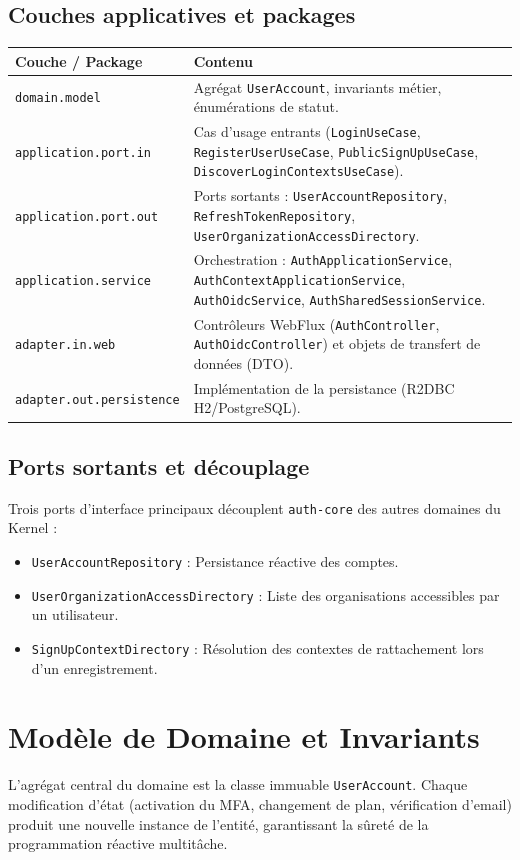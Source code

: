 \documentclass[
]{IPLeiriaThesis}
\newcommand{\code}[1]{\texttt{\small #1}}
\begin{document}
\subsection{Couches applicatives et packages}
\begin{center}
\small
\begin{longtable}{@{}p{4cm}p{10cm}@{}}
\toprule
\textbf{Couche / Package} & \textbf{Contenu} \\
\midrule
\code{domain.model} & Agrégat \code{UserAccount}, invariants métier, énumérations de statut. \\
\code{application.port.in} & Cas d'usage entrants (\code{LoginUseCase}, \code{RegisterUserUseCase}, \code{PublicSignUpUseCase}, \code{DiscoverLoginContextsUseCase}). \\
\code{application.port.out} & Ports sortants : \code{UserAccountRepository}, \code{RefreshTokenRepository}, \code{UserOrganizationAccessDirectory}. \\
\code{application.service} & Orchestration : \code{AuthApplicationService}, \code{AuthContextApplicationService}, \code{AuthOidcService}, \code{AuthSharedSessionService}. \\
\code{adapter.in.web} & Contrôleurs WebFlux (\code{AuthController}, \code{AuthOidcController}) et objets de transfert de données (DTO). \\
\code{adapter.out.persistence} & Implémentation de la persistance (R2DBC H2/PostgreSQL). \\
\bottomrule
\end{longtable}
\end{center}

\subsection{Ports sortants et découplage}
Trois ports d'interface principaux découplent \code{auth-core} des autres domaines du Kernel :
\begin{itemize}
  \item \code{UserAccountRepository} : Persistance réactive des comptes.
  \item \code{UserOrganizationAccessDirectory} : Liste des organisations accessibles par un utilisateur.
  \item \code{SignUpContextDirectory} : Résolution des contextes de rattachement lors d'un enregistrement.
\end{itemize}

\section{Modèle de Domaine et Invariants}
L'agrégat central du domaine est la classe immuable \code{UserAccount}. Chaque modification d'état (activation du MFA, changement de plan, vérification d'email) produit une nouvelle instance de l'entité, garantissant la sûreté de la programmation réactive multitâche.
\end{document}
